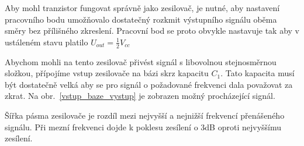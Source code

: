\documentclass{article}
\newcommand \obr[1]
{ obr.~\ref{#1}}
\begin{document}
Aby mohl tranzistor fungovat správně jako zesilovač, je nutné, aby nastavení pracovního bodu umožňovalo dostatečný rozkmit výstupního signálu oběma směry bez přílišného zkreslení.
Pracovní bod se proto obvykle nastavuje tak aby v ustáleném stavu platilo \(U_{out} = \frac{1}{2}V_{cc}\)

Abychom mohli na tento zesilovač přivést signál s libovolnou stejnosměrnou složkou, přípojíme vstup zesilovače na bázi skrz kapacitu \(C_1\).
Tato kapacita musí být dostatečně velká aby se pro signál o požadované frekvenci dala považovat za zkrat.
Na \obr{vstup_baze_vystup} je zobrazen možný procházející signál.

Šířka pásma zesilovače je rozdíl mezi nejvyšší a nejnižší frekvencí přenášeného signálu.
Při mezní frekvenci dojde k poklesu zesílení o 3dB oproti nejvyššímu zesílení.

\newpage
\end{document}
